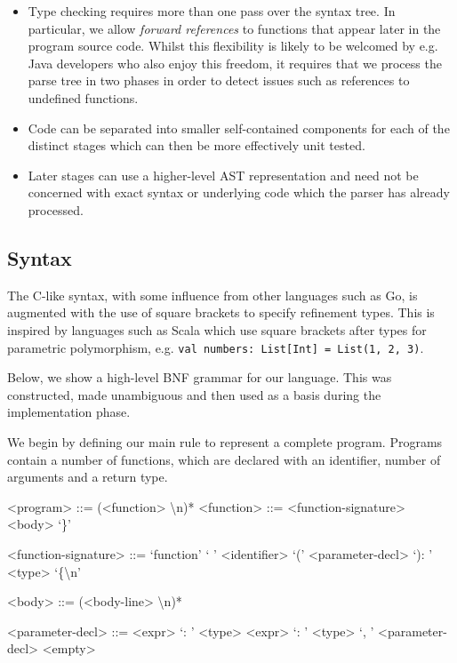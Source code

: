 \documentclass[a4paper,openany,12pt]{book}
\begin{document}
\begin{itemize}
    \item Type checking requires more than one pass over the syntax tree.
          In particular, we allow \emph{forward references} to functions that appear later in the program source code.
          Whilst this flexibility is likely to be welcomed by e.g. Java developers who also enjoy this freedom,
          it requires that we process the parse tree in two phases in order to detect issues such as references to
          undefined functions.
    \item Code can be separated into smaller self-contained components for each of the distinct stages
          which can then be more effectively unit tested.
    \item Later stages can use a higher-level AST representation and need not be concerned with exact syntax or
          underlying code which the parser has already processed.
\end{itemize}


\subsection{Syntax}\label{subsec:syntax}

The C-like syntax, with some influence from other languages such as Go, is augmented with the use of square brackets
to specify refinement types.
This is inspired by languages such as Scala which use square brackets after types for parametric polymorphism,
e.g. \texttt{val numbers: List[Int] = List(1, 2, 3)}.

Below, we show a high-level BNF grammar for our language.
This was constructed, made unambiguous and then used as a basis during the implementation phase.

\setlength{\grammarparsep}{20pt plus 1pt minus 1pt} %
\setlength{\grammarindent}{12em} %

We begin by defining our main rule to represent a complete program.
Programs contain a number of functions, which are declared with an identifier, number of arguments and a return type.

\begin{grammar}
    <program> ::= (<function> \textbackslash n)*
    <function> ::= <function-signature> <body> `\}'

    <function-signature> ::= `function' ` ' <identifier> `(' <parameter-decl> `): ' <type> `\{\textbackslash n'

    <body> ::= (<body-line> \textbackslash n)*

    <parameter-decl> ::= <expr> `: ' <type>
    \alt <expr> `: ' <type> `, ' <parameter-decl>
    \alt <empty>
\end{grammar}
\end{document}
